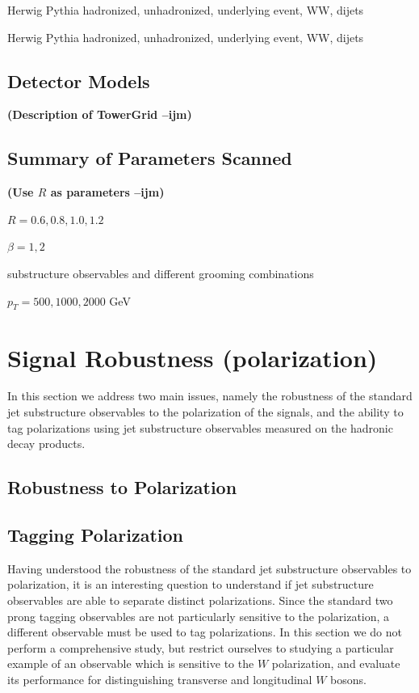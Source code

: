 \documentclass[11pt,letterpaper]{article}
\newcommand{\ijm}[1]{\textbf{\textcolor{llblue}{(#1 --ijm)}}}
\begin{document}
Herwig Pythia hadronized, unhadronized, underlying event, WW, dijets

Herwig Pythia hadronized, unhadronized, underlying event, WW, dijets


\subsection{Detector Models}

\ijm{Description of TowerGrid}


\subsection{Summary of Parameters Scanned}

\ijm{Use $R$ as parameters}

$R=0.6,0.8,1.0,1.2$

$\beta=1,2$

substructure observables and different grooming combinations

$p_T=500,1000,2000$ GeV

\section{Signal Robustness (polarization)}

In this section we address two main issues, namely the robustness of the standard jet substructure observables to the polarization of the signals, and the ability to tag polarizations using jet substructure observables measured on the hadronic decay products.

\subsection{Robustness to Polarization}

\subsection{Tagging Polarization}

Having understood the robustness of the standard jet substructure observables to polarization, it is an interesting question to understand if jet substructure observables are able to separate distinct polarizations. Since the standard two prong tagging observables are not particularly sensitive to the polarization, a different observable must be used to tag polarizations. In this section we do not perform a comprehensive study, but restrict ourselves to studying a particular example of an observable which is sensitive to the $W$ polarization, and evaluate its performance for distinguishing transverse and longitudinal $W$ bosons. 
\end{document}
